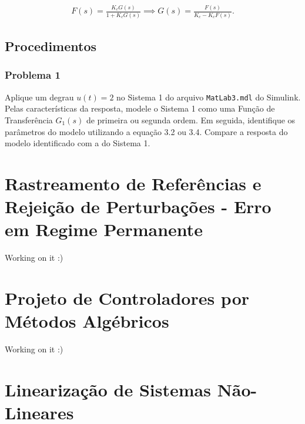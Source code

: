 \documentclass[
]{book}
\begin{document}
\begin{align}
F(s) = \frac {K_cG(s)}{1+K_cG(s)} \implies G(s) = \frac {F(s)}{K_c - K_cF(s)}.  \label{eq:eq5}
\end{align}

\hypertarget{procedimentos-1}{%
\section{Procedimentos}\label{procedimentos-1}}

\hypertarget{problema-1-1}{%
\subsection*{Problema 1}\label{problema-1-1}}

Aplique um degrau \(u(t) = 2\) no Sistema 1 do arquivo \texttt{MatLab3.mdl} do Simulink. Pelas características da resposta, modele o Sistema 1 como uma Função de Transferência \(G_1(s)%
\) de primeira ou segunda ordem. Em seguida, identifique os parâmetros do modelo utilizando a equação 3.2 ou 3.4. Compare a resposta do modelo identificado com a do Sistema 1.

\hypertarget{rastreamento-de-referuxeancias-e-rejeiuxe7uxe3o-de-perturbauxe7uxf5es---erro-em-regime-permanente}{%
\chapter{Rastreamento de Referências e Rejeição de Perturbações - Erro em Regime Permanente}\label{rastreamento-de-referuxeancias-e-rejeiuxe7uxe3o-de-perturbauxe7uxf5es---erro-em-regime-permanente}}

Working on it :)

\hypertarget{projeto-de-controladores-por-muxe9todos-alguxe9bricos}{%
\chapter{Projeto de Controladores por Métodos Algébricos}\label{projeto-de-controladores-por-muxe9todos-alguxe9bricos}}

Working on it :)

\hypertarget{linearizauxe7uxe3o-de-sistemas-nuxe3o-lineares}{%
\chapter{Linearização de Sistemas Não-Lineares}\label{linearizauxe7uxe3o-de-sistemas-nuxe3o-lineares}}
\end{document}
